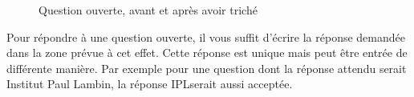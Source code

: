 \documentclass[11pt]{scrreprt}
\begin{document}
\begin{figure}[H]
{        }
        \caption{Question ouverte, avant et après avoir triché}
    \end{figure}
    Pour répondre à une question ouverte, il vous suffit d'écrire la réponse demandée dans la zone prévue à cet effet. Cette réponse est unique mais peut être entrée de différente manière. Par exemple pour une question dont la réponse attendu serait \og Institut Paul Lambin\fg, la réponse \og IPL\fg serait aussi acceptée.\\
\end{document}
